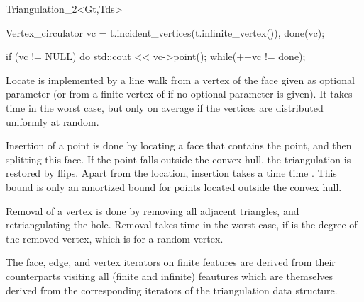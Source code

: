 \begin{ccClassTemplate}{Triangulation_2<Gt,Tds>}
\begin{cprog}
{    Vertex_circulator vc = t.incident_vertices(t.infinite_vertex()),
                      done(vc);

    if (vc != NULL) {
        do{
            std::cout << vc->point();
        }while(++vc != done);
    }
}
\end{cprog} 


Locate is implemented by a line walk from a vertex of the face given
as optional parameter (or from a finite vertex of
 if no optional parameter is given). It takes
time  in the worst case, but only 
on average if the vertices are distributed uniformly at random.

Insertion of a point is done by locating a face that contains the
point, and then splitting this face.
If the point falls outside the convex hull, the triangulation
 is restored by flips.  Apart from the location, insertion takes a time 
time . This bound is only an amortized bound
for points located outside the convex hull.

Removal of a vertex is done by removing all adjacent triangles, and
retriangulating the hole. Removal takes time  in the worst
case, if  is the degree of the removed vertex,
which is  for a random vertex.

The face, edge, and vertex iterators on finite features
are derived from their counterparts visiting all (finite and infinite)
feautures which are themselves derived from the corresponding iterators
of the triangulation data structure.

\end{ccClassTemplate}


